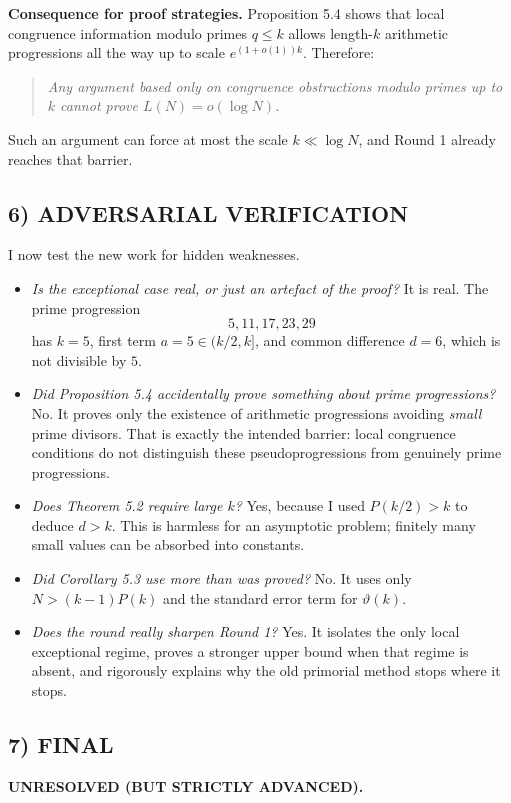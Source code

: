 \medskip
\noindent\textbf{Consequence for proof strategies.}
Proposition 5.4 shows that local congruence information modulo primes $q\le k$ allows length-$k$ arithmetic progressions all the way up to scale $e^{(1+o(1))k}$.  Therefore:
\begin{quote}
\emph{Any argument based only on congruence obstructions modulo primes up to $k$ cannot prove $L(N)=o(\log N)$.}
\end{quote}
Such an argument can force at most the scale $k\ll \log N$, and Round 1 already reaches that barrier.

\subsection*{6) ADVERSARIAL VERIFICATION}
I now test the new work for hidden weaknesses.
\begin{itemize}
\item \emph{Is the exceptional case real, or just an artefact of the proof?}  It is real.  The prime progression
\[
5,11,17,23,29
\]
has $k=5$, first term $a=5\in (k/2,k]$, and common difference $d=6$, which is not divisible by $5$.
\item \emph{Did Proposition 5.4 accidentally prove something about prime progressions?}  No.  It proves only the existence of arithmetic progressions avoiding \emph{small} prime divisors.  That is exactly the intended barrier: local congruence conditions do not distinguish these pseudoprogressions from genuinely prime progressions.
\item \emph{Does Theorem 5.2 require large $k$?}  Yes, because I used $P(k/2)>k$ to deduce $d>k$.  This is harmless for an asymptotic problem; finitely many small values can be absorbed into constants.
\item \emph{Did Corollary 5.3 use more than was proved?}  No.  It uses only $N>(k-1)P(k)$ and the standard error term for $\vartheta(k)$.
\item \emph{Does the round really sharpen Round 1?}  Yes.  It isolates the only local exceptional regime, proves a stronger upper bound when that regime is absent, and rigorously explains why the old primorial method stops where it stops.
\end{itemize}

\subsection*{7) FINAL}
\textbf{UNRESOLVED (BUT STRICTLY ADVANCED).}

